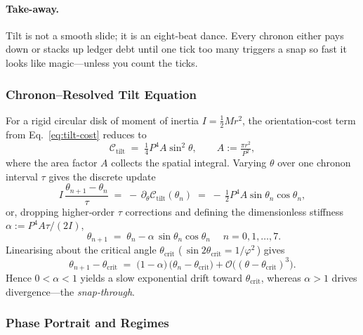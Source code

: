 \documentclass[11pt,oneside]{book}
\begin{document}
\paragraph{Take-away.}
Tilt is not a smooth slide; it is an eight-beat dance.  Every chronon
either pays down or stacks up ledger debt until one tick too many
triggers a snap so fast it looks like magic—unless you count the
ticks.



\subsubsection{Chronon–Resolved Tilt Equation}
\label{ss:tilt-map}

For a rigid circular disk of moment of inertia  
$I = \tfrac12 M r^{2}$, the orientation‐cost term from
Eq.~\eqref{eq:tilt-cost} reduces to
\[
   \mathcal C_{\text{tilt}}
   \;=\;
   \tfrac14 P^{4} A \sin^{2}\theta,
   \qquad
   A := \tfrac{\pi r^{2}}{P^{2}},
\]
where the area factor $A$ collects the spatial integral.
Varying $\theta$ over one chronon interval $\tau$ gives the discrete
update
\[
   I\,\frac{\theta_{n+1}-\theta_{n}}{\tau}
   \;=\;
   -\,\partial_{\theta}\mathcal C_{\text{tilt}}(\theta_{n})
   \;=\;
   -\,\tfrac12 P^{4} A \sin\theta_{n}\cos\theta_{n},
\]
or, dropping higher‐order $\tau$ corrections and defining the
dimensionless stiffness  
$\alpha := P^{4}A\tau/(2I)$,
\begin{equation}
   \boxed{\;
      \theta_{n+1}
      \;=\;
      \theta_{n}
      -\alpha\,
        \sin\theta_{n}\cos\theta_{n}
      \;}
   \quad n=0,1,\dots,7.
   \label{eq:chronon-map}
\end{equation}
Linearising about the critical angle
$\theta_{\text{crit}}$ (\,$\sin2\theta_{\text{crit}}=1/\varphi^{2}$\,)
gives
\[
   \theta_{n+1}-\theta_{\text{crit}}
   \;=\;
   \bigl(1-\alpha\bigr)\,
   \bigl(\theta_{n}-\theta_{\text{crit}}\bigr)
   +\mathcal O\!\bigl((\theta-\theta_{\text{crit}})^{3}\bigr).
\]
Hence $0<\alpha<1$ yields a slow exponential drift toward  
$\theta_{\text{crit}}$, whereas $\alpha>1$ drives divergence—­the
\emph{snap‐through}.

\subsubsection{Phase Portrait and Regimes}
\label{ss:tilt-phase}
\end{document}
